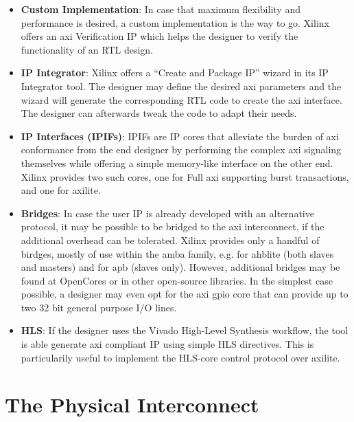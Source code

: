 \begin{itemize}
\item	\textbf{Custom Implementation}:
	In case that maximum flexibility and performance is desired,
	a custom implementation is the way to go. 
	Xilinx offers an \gls{axi} Verification IP 
	which helps the designer to verify the functionality of an RTL design.

\item	\textbf{IP Integrator}:
	Xilinx offers a ``Create and Package IP'' wizard in its IP Integrator tool.
	The designer may define the desired \gls{axi} parameters 
	and the wizard will generate the corresponding RTL code
	to create the \gls{axi} interface. 
	The designer can afterwards tweak the code to adapt their needs.

\item	\textbf{IP Interfaces (IPIFs)}:
	IPIFs are IP cores that alleviate the burden of \gls{axi} conformance 
	from the end designer by performing the complex \gls{axi} signaling 
	themselves while offering a simple memory-like interface on the other end. 
	Xilinx provides two such cores, one for Full \gls{axi} 
	supporting \gls{burst} transactions, and one for \gls{axilite}.

\item	\textbf{Bridges}: In case the user IP is already developed with an alternative protocol,
	it may be possible to be bridged to the \gls{axi} interconnect, 
	if the additional overhead can be tolerated.
	Xilinx provides only a handful of birdges, mostly of use within the \gls{amba} family, 
	e.g. for \gls{ahblite} (both slaves and masters) and for \gls{apb} (slaves only). 
	However, additional bridges may be found at OpenCores or in other open-source libraries. 
	In the simplest case possible, a designer may even opt for 
	the \gls{axi} \gls{gpio} core that can provide up to two 32 bit general purpose I/O lines.

\item	\textbf{HLS}: If the designer uses the Vivado High-Level Synthesis workflow,
	the tool is able generate \gls{axi} compliant IP using simple HLS directives. 
	This is particularily useful to implement the HLS-core control protocol over \gls{axilite}.
\end{itemize}

\section{The Physical Interconnect}
\label{sect:interconnect}

